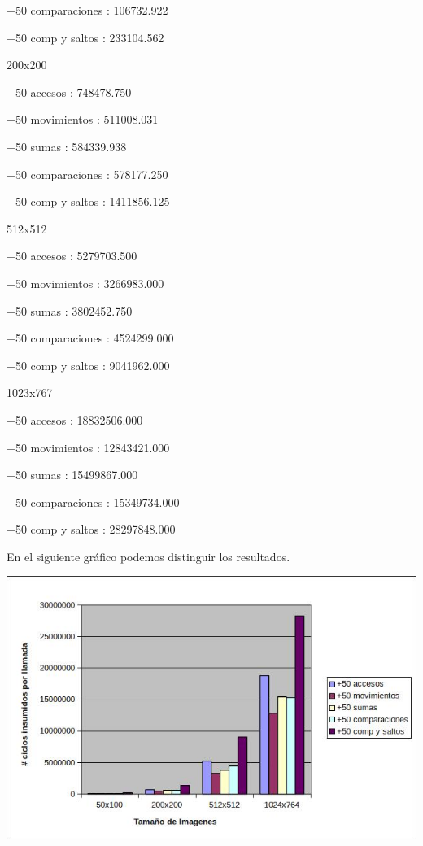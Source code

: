 +50 comparaciones	: 106732.922

+50 comp y saltos	: 233104.562

\vspace*{0.3cm} \noindent
200x200

+50 accesos		: 748478.750

+50 movimientos		: 511008.031

+50 sumas		: 584339.938

+50 comparaciones	: 578177.250

+50 comp y saltos	: 1411856.125

\vspace*{0.3cm} \noindent
512x512

+50 accesos		: 5279703.500

+50 movimientos		: 3266983.000

+50 sumas		: 3802452.750

+50 comparaciones	: 4524299.000

+50 comp y saltos	: 9041962.000

\vspace*{0.3cm} \noindent
1023x767

+50 accesos		: 18832506.000

+50 movimientos		: 12843421.000

+50 sumas		: 15499867.000

+50 comparaciones	: 15349734.000

+50 comp y saltos	: 28297848.000

\vspace*{0.3cm} \noindent

  En el siguiente gráfico podemos distinguir los resultados.
  \vspace*{0.2cm} \noindent\vspace*{0.2cm} \noindent


  \begin{center}
 \includegraphics[scale=0.7]{popart2.jpg}
 \end{center}
  \vspace*{0.3cm} 
  


